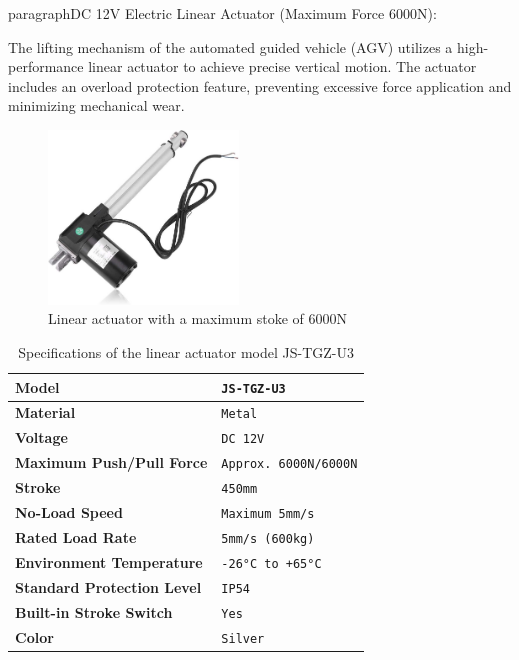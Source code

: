 \documentclass[../../main]{subfiles}
\begin{document}
\newpage

paragraph{DC 12V Electric Linear Actuator (Maximum Force 6000N):}

The lifting mechanism of the automated guided vehicle (AGV)  
utilizes a high-performance linear actuator to achieve  
precise vertical motion. The actuator includes an overload  
protection feature, preventing excessive force application  
and minimizing mechanical wear.

\begin{figure}[h!]
    \centering
    \includegraphics[width=0.45\textwidth]{fig/linear_actuator.jpg}
    \caption{Linear actuator with a maximum stoke of 6000N }
    \label{Linear actuator} %
\end{figure}

\begin{table}[h!]
    \centering
    \begin{tabular}{|>{\bfseries}l|>{\ttfamily}l|} %
    \hline
    Model & \texttt{JS-TGZ-U3} \\ \hline
    Material & \texttt{Metal} \\ \hline
    Voltage & \texttt{DC 12V} \\ \hline
    Maximum Push/Pull Force & \texttt{Approx. 6000N/6000N} \\ \hline
    Stroke & \texttt{450mm} \\ \hline
    No-Load Speed & \texttt{Maximum 5mm/s} \\ \hline
    Rated Load Rate & \texttt{5mm/s (600kg)} \\ \hline
    Environment Temperature & \texttt{-26°C to +65°C} \\ \hline
    Standard Protection Level & \texttt{IP54} \\ \hline
    Built-in Stroke Switch & \texttt{Yes} \\ \hline
    Color & \texttt{Silver} \\ \hline
    \end{tabular}
    \caption{Specifications of the linear actuator model JS-TGZ-U3}
    \label{Linear Actuator Specifications} %
    
\end{table}
\end{document}
